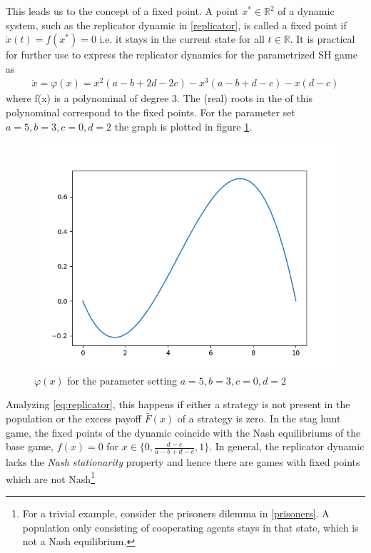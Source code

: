 \documentclass[11pt]{article}
\newcommand{\realnumb}{\mathbb{R}}
\begin{document}
This leads us to the concept of a fixed point. A point $x^* \in \realnumb^2$ of a dynamic system,
such as the replicator dynamic in \eqref{replicator}, is called a fixed point
if $\dot{x}(t) = f(x^*) = 0$ i.e. it stays in the current state for all $t \in 
\realnumb$. 
It is practical for further use to express the replicator dynamics for the
parametrized SH game as 
\begin{align}
        \dot{x} = \varphi(x) = x^2(a-b+2d-2c) - x^3(a-b+d-c) -x(d-c) 
\end{align}
where f(x) is a polynominal of degree $3$. The (real) roots in the 
of this polynominal correspond to the fixed points. 
For the parameter set $a=5, b=3, c=0, d=2$  the graph is plotted in figure 
\ref{fig:polynominal}.
\begin{figure}[h]
        \label{fig:polynominal}
        \centering
        \includegraphics[scale=0.5]{polynominal.png}
        \caption{$\varphi(x)$ for the parameter setting $a=5, b=3, c=0, d=2$}
\end{figure}
Analyzing \eqref{eq:replicator}, this happens if either a strategy
is not present in the population or the excess payoff $\bar{F}(x)$
of a strategy is zero. In the stag hunt game, the fixed points of the
dynamic coincide with the Nash equilibriums of the base game, $f(x) = 0$ for
$x \in \{0,\frac{d-c}{a-b+d-c},1\}$. In general, 
the replicator dynamic lacks the \textit{Nash stationarity} property
and hence there are games with fixed points which are not
Nash\footnote{For a trivial example, consider the prisoners dilemma in 
\ref{prisoners}. A population only consisting of cooperating agents stays in
that state, which is not a Nash equilibrium.} 
\end{document}
